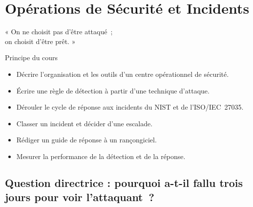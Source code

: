 
\chapter{Opérations de Sécurité et Incidents}
\label{chap:operations}

\epigraph{%
    « On ne choisit pas d'être attaqué~;\\
    on choisit d'être prêt. »%
}{Principe du cours}


\begin{boxobjectifs}
\begin{itemize}
    \item Décrire l'organisation et les outils d'un centre opérationnel de
          sécurité.
    \item Écrire une règle de détection à partir d'une technique
          d'attaque.
    \item Dérouler le cycle de réponse aux incidents du NIST et de
          l'ISO/IEC~27035.
    \item Classer un incident et décider d'une escalade.
    \item Rédiger un guide de réponse à un rançongiciel.
    \item Mesurer la performance de la détection et de la réponse.
\end{itemize}
\end{boxobjectifs}

\bigskip

\section*{Question directrice : pourquoi a-t-il fallu trois jours pour voir l'attaquant~?}

